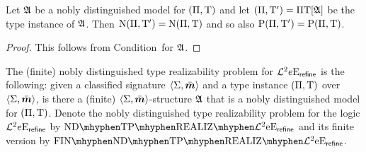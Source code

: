 \begin{remark}\label{rem:ndis-noble-exact}
Let $\mathfrak{A}$ be a nobly distinguished model for $(\Pi,\mathrm{T})$ and let
$(\Pi,{\mathrm{T}'}) = \Pi\mathrm{T}[\mathfrak{A}]$ be the type instance of $\mathfrak{A}$.
Then $\mathrm{\mathrm{N}}(\Pi,{\mathrm{T}'}) = \mathrm{\mathrm{N}}(\Pi,\mathrm{T})$ and so also $\mathrm{P}(\Pi,{\mathrm{T}'}) =
\mathrm{P}(\Pi,\mathrm{T})$.
\end{remark}
\begin{proof}
This follows from Condition~ for $\mathfrak{A}$.
\end{proof}

\begin{definition}
The (finite) nobly distinguished type realizability problem for
$\mathcal{L}^{2}{e}\mathrm{E}_{\mathsf{refine}}$ is the following: given a classified signature
$\left\langle \mathrm{\Sigma},\bar{\bm{m}} \right\rangle$ and a type instance $(\Pi,\mathrm{T})$ over $\left\langle \mathrm{\Sigma},\bar{\bm{m}} \right\rangle$,
is there a (finite) $\left\langle \mathrm{\Sigma},\bar{\bm{m}} \right\rangle$-structure $\mathfrak{A}$ that is a nobly
distinguished model for $(\Pi,\mathrm{T})$. Denote the nobly distinguished type
realizability problem for the logic $\mathcal{L}^{2}{e}\mathrm{E}_{\mathsf{refine}}$ by
$\NDReal{\vFo2\Eea\sze\agrefine}$ and its finite version by
$\FinNDReal{\vFo2\Eea\sze\agrefine}$.
\end{definition}


